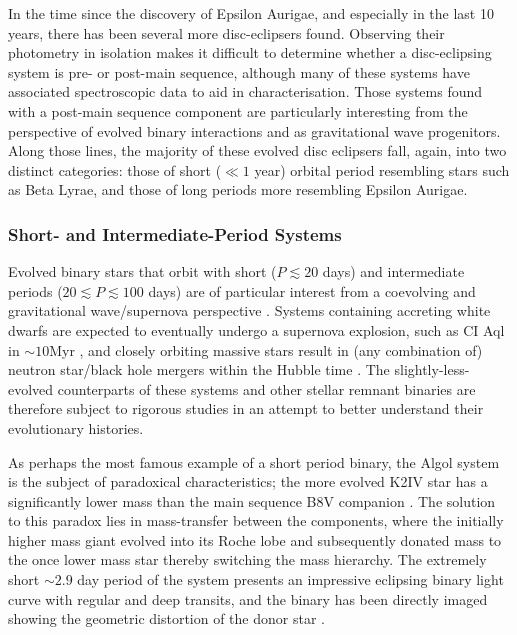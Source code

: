 \documentclass[%
 reprint,
 amsmath,amssymb,
 aps,
rmp,
floatfix,
]{revtex4-2}
\begin{document}
In the time since the discovery of Epsilon Aurigae, and especially in the last 10 years, there has been several more disc-eclipsers found. Observing their photometry in isolation makes it difficult to determine whether a disc-eclipsing system is pre- or post-main sequence, although many of these systems have associated spectroscopic data to aid in characterisation. Those systems found with a post-main sequence component are particularly interesting from the perspective of evolved binary interactions and as gravitational wave progenitors. Along those lines, the majority of these evolved disc eclipsers fall, again, into two distinct categories: those of short ($\ll 1$ year) orbital period resembling stars such as Beta Lyrae, and those of long periods more resembling Epsilon Aurigae.

\subsubsection{Short- and Intermediate-Period Systems}
Evolved binary stars that orbit with short ($P \lesssim 20$ days) and intermediate periods ($20 \lesssim P \lesssim 100$ days) are of particular interest from a coevolving and gravitational wave/supernova perspective \citep{Sana2012Sci}. Systems containing accreting white dwarfs are expected to eventually undergo a supernova explosion, such as CI Aql in $\sim 10$Myr \citep{Lederle2003A&A, Sahman2013MNRAS}, and closely orbiting massive stars result in (any combination of) neutron star/black hole mergers within the Hubble time \citep{Kruckow2018MNRAS}. The slightly-less-evolved counterparts of these systems and other stellar remnant binaries are therefore subject to rigorous studies in an attempt to better understand their evolutionary histories.

As perhaps the most famous example of a short period binary, the Algol system is the subject of paradoxical characteristics; the more evolved K2IV star has a significantly lower mass than the main sequence B8V companion \citep{Baron2012ApJ}. The solution to this paradox lies in mass-transfer between the components, where the initially higher mass giant evolved into its Roche lobe and subsequently donated mass to the once lower mass star thereby switching the mass hierarchy. The extremely short $\sim 2.9$ day period of the system presents an impressive eclipsing binary light curve with regular and deep transits, and the binary has been directly imaged showing the geometric distortion of the donor star \citep{Baron2012ApJ}. 
\end{document}
